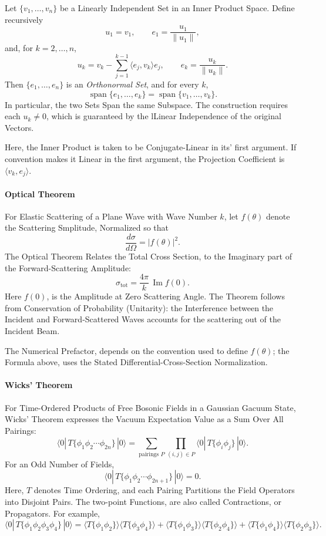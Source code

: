\documentclass[a4paper, 10pt, onepage]{elegantbook}
\begin{document}
{\noindent

Let $\{v_1,\ldots,v_n\}$ be a Linearly Independent Set in an Inner
Product Space. Define recursively
\[
u_1=v_1,
\qquad
e_1=\frac{u_1}{\|u_1\|},
\]
and, for $k=2,\ldots,n$,
\[
u_k=v_k-\sum_{j=1}^{k-1}\langle e_j,v_k\rangle e_j,
\qquad
e_k=\frac{u_k}{\|u_k\|}.
\]
Then $\{e_1,\ldots,e_n\}$ is an \emph{Orthonormal Set}, and for every
$k$,
\[
\operatorname{span}\{e_1,\ldots,e_k\}
=
\operatorname{span}\{v_1,\ldots,v_k\}.
\]
In particular, the two Sets Span the same Subspace. The construction requires each $u_k\ne 0$, which is guaranteed by 
the lLinear Independence of the original Vectors.  

Here, the Inner Product is taken to be Conjugate-Linear in its' first argument. If convention makes it Linear in the 
first argument, the Projection Coefficient is $\langle v_k,e_j\rangle$.

\paragraph{Optical Theorem}

\noindent

For Elastic Scattering of a Plane Wave with Wave Number $k$, let $f(\theta)$ denote the Scattering Smplitude, 
Normalized so that
\[
\frac{d\sigma}{d\Omega}=|f(\theta)|^2.
\]
The Optical Theorem Relates the Total Cross Section, to the Imaginary part
of the Forward-Scattering Amplitude:
\[
\sigma_{\mathrm{tot}}
=
\frac{4\pi}{k}\,\operatorname{Im} f(0).
\]
Here $f(0)$, is the Amplitude at Zero Scattering Angle. The Theorem follows from Conservation of Probability 
(Unitarity): the Interference
between the Incident and Forward-Scattered Waves accounts for the scattering out of the Incident Beam.  

The Numerical Prefactor, depends on the convention used to define $f(\theta)$; the Formula above, uses the Stated 
Differential-Cross-Section Normalization.

\paragraph{Wicks' Theorem}

\noindent

For Time-Ordered Products of Free Bosonic Fields in a Gaussian Gacuum State, Wicks' Theorem expresses the Vacuum 
Expectation Value as a Sum Over All Pairings:
\[
\langle 0|\,T\{\phi_1\phi_2\cdots\phi_{2n}\}\,|0\rangle
=
\sum_{\text{pairings }P}
\prod_{(i,j)\in P}
\langle 0|\,T\{\phi_i\phi_j\}\,|0\rangle .
\]
For an Odd Number of Fields,
\[
\langle 0|\,T\{\phi_1\phi_2\cdots\phi_{2n+1}\}\,|0\rangle=0.
\]
Here, $T$ denotes Time Ordering, and each Pairing Partitions the Field Operators into Disjoint Pairs. The two-point 
Functions, are also called
Contractions, or Propagators. For example,
\[
\langle 0|\,T\{\phi_1\phi_2\phi_3\phi_4\}\,|0\rangle
=
\langle T\{\phi_1\phi_2\}\rangle\langle T\{\phi_3\phi_4\}\rangle
+\langle T\{\phi_1\phi_3\}\rangle\langle T\{\phi_2\phi_4\}\rangle
+\langle T\{\phi_1\phi_4\}\rangle\langle T\{\phi_2\phi_3\}\rangle .
\]

}
\end{document}
